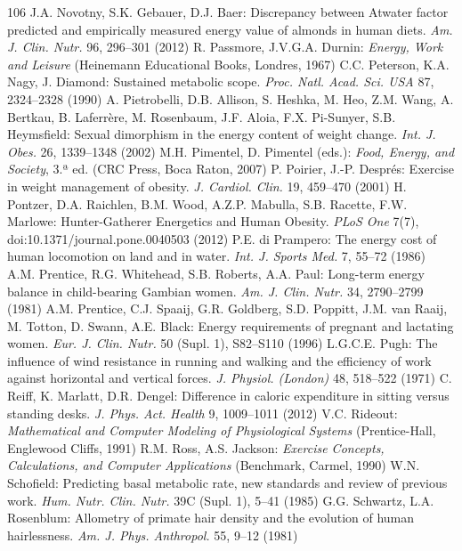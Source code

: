 \documentclass[12pt]{book}
\begin{document}
\begin{thebibliography}{106}
   J.A. Novotny, S.K. Gebauer, D.J. Baer: Discrepancy between Atwater factor predicted and empirically measured energy value of almonds in human diets. \textit{Am. J. Clin. Nutr.} 96, 296--301 (2012)
   R. Passmore, J.V.G.A. Durnin: \textit{Energy, Work and Leisure} (Heinemann Educational Books, Londres, 1967)
   C.C. Peterson, K.A. Nagy, J. Diamond: Sustained metabolic scope. \textit{Proc. Natl. Acad. Sci. USA} 87, 2324--2328 (1990)
   A. Pietrobelli, D.B. Allison, S. Heshka, M. Heo, Z.M. Wang, A. Bertkau, B. Laferrère, M. Rosenbaum, J.F. Aloia, F.X. Pi-Sunyer, S.B. Heymsfield: Sexual dimorphism in the energy content of weight change. \textit{Int. J. Obes.} 26, 1339--1348 (2002)
   M.H. Pimentel, D. Pimentel (eds.): \textit{Food, Energy, and Society}, 3.ª ed. (CRC Press, Boca Raton, 2007)
   P. Poirier, J.-P. Després: Exercise in weight management of obesity. \textit{J. Cardiol. Clin.} 19, 459--470 (2001)
   H. Pontzer, D.A. Raichlen, B.M. Wood, A.Z.P. Mabulla, S.B. Racette, F.W. Marlowe: Hunter-Gatherer Energetics and Human Obesity. \textit{PLoS One} 7(7), doi:10.1371/journal.pone.0040503 (2012)
   P.E. di Prampero: The energy cost of human locomotion on land and in water. \textit{Int. J. Sports Med.} 7, 55--72 (1986)
   A.M. Prentice, R.G. Whitehead, S.B. Roberts, A.A. Paul: Long-term energy balance in child-bearing Gambian women. \textit{Am. J. Clin. Nutr.} 34, 2790--2799 (1981)
   A.M. Prentice, C.J. Spaaij, G.R. Goldberg, S.D. Poppitt, J.M. van Raaij, M. Totton, D. Swann, A.E. Black: Energy requirements of pregnant and lactating women. \textit{Eur. J. Clin. Nutr.} 50 (Supl. 1), S82--S110 (1996)
   L.G.C.E. Pugh: The influence of wind resistance in running and walking and the efficiency of work against horizontal and vertical forces. \textit{J. Physiol. (London)} 48, 518--522 (1971)
   C. Reiff, K. Marlatt, D.R. Dengel: Difference in caloric expenditure in sitting versus standing desks. \textit{J. Phys. Act. Health} 9, 1009--1011 (2012)
   V.C. Rideout: \textit{Mathematical and Computer Modeling of Physiological Systems} (Prentice-Hall, Englewood Cliffs, 1991)
   R.M. Ross, A.S. Jackson: \textit{Exercise Concepts, Calculations, and Computer Applications} (Benchmark, Carmel, 1990)
   W.N. Schofield: Predicting basal metabolic rate, new standards and review of previous work. \textit{Hum. Nutr. Clin. Nutr.} 39C (Supl. 1), 5--41 (1985)
   G.G. Schwartz, L.A. Rosenblum: Allometry of primate hair density and the evolution of human hairlessness. \textit{Am. J. Phys. Anthropol.} 55, 9--12 (1981)

\end{thebibliography}
\end{document}
